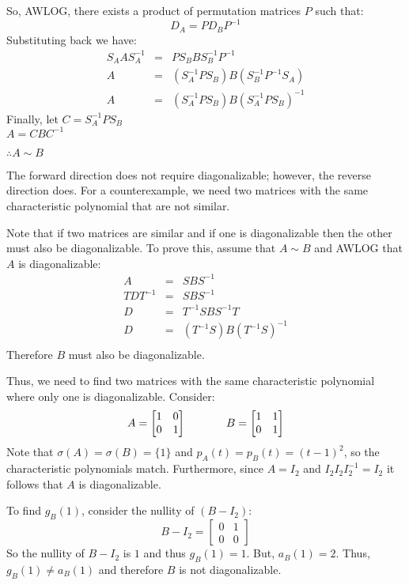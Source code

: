 \documentclass[letterpaper,12pt,fleqn]{article}
\begin{document}
\begin{description}
  So, AWLOG, there exists a product of permutation matrices $P$ such that:
  \[D_A=PD_BP^{-1}\]
  Substituting back we have:
  \begin{eqnarray*}
    S_AAS_A^{-1} &=& PS_BBS_B^{-1}P^{-1} \\
    A &=& (S_A^{-1}PS_B)B(S_B^{-1}P^{-1}S_A) \\
    A &=& (S_A^{-1}PS_B)B(S_A^{-1}PS_B)^{-1}
  \end{eqnarray*}
  Finally, let $C=S_A^{-1}PS_B$ \\
  $A=CBC^{-1}$

  $\therefore A\sim B$
\end{description}

The forward direction does not require diagonalizable; however, the reverse
direction does. For a counterexample, we need two matrices with the same characteristic
polynomial that are not similar.

Note that if two matrices are similar and if one is diagonalizable then the other must
also be diagonalizable. To prove this, assume that $A\sim B$ and AWLOG that $A$ is
diagonalizable:
\begin{eqnarray*}
  A &=& SBS^{-1} \\
  TDT^{-1} &=& SBS^{-1} \\
  D &=& T^{-1}SBS^{-1}T \\
  D &=& (T^{-1}S)B(T^{-1}S)^{-1} \\
\end{eqnarray*}
Therefore $B$ must also be diagonalizable.

Thus, we need to find two matrices with the same characteristic polynomial where only
one is diagonalizable. Consider:
\[A=\begin{bmatrix} 1 & 0 \\ 0 & 1 \end{bmatrix}\hspace{0.5in}
B=\begin{bmatrix} 1 & 1 \\ 0 & 1 \end{bmatrix}\]
Note that $\sigma(A)=\sigma(B)=\{1\}$ and $p_A(t)=p_B(t)=(t-1)^2$, so the characteristic
polynomials match. Furthermore, since $A=I_2$ and $I_2I_2I_2^{-1}=I_2$ it follows that
$A$ is diagonalizable.

To find $g_B(1)$, consider the nullity of $(B-I_2)$:
\[B-I_2=\begin{bmatrix} 0 & 1 \\ 0 & 0 \end{bmatrix}\]
So the nullity of $B-I_2$ is $1$ and thus $g_B(1)=1$. But, $a_B(1)=2$. Thus,
$g_B(1)\ne a_B(1)$ and therefore $B$ is not diagonalizable.
\end{document}
